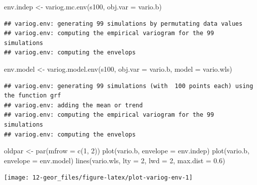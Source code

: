 \documentclass[
  spanish,
]{book}
\newenvironment{Shaded}{\begin{snugshade}}{\end{snugshade}}
\newcommand{\AttributeTok}[1]{\textcolor[rgb]{0.77,0.63,0.00}{#1}}
\newcommand{\DecValTok}[1]{\textcolor[rgb]{0.00,0.00,0.81}{#1}}
\newcommand{\FloatTok}[1]{\textcolor[rgb]{0.00,0.00,0.81}{#1}}
\newcommand{\FunctionTok}[1]{\textcolor[rgb]{0.00,0.00,0.00}{#1}}
\newcommand{\NormalTok}[1]{#1}
\newcommand{\OtherTok}[1]{\textcolor[rgb]{0.56,0.35,0.01}{#1}}
\theoremstyle{break}
\theoremstyle{definition}
\theoremstyle{definition}
\theoremstyle{definition}
\theoremstyle{definition}
\theoremstyle{remark}
\begin{document}
\begin{Shaded}
\begin{Highlighting}[]
\NormalTok{env.indep }\OtherTok{\textless{}{-}} \FunctionTok{variog.mc.env}\NormalTok{(s100, }\AttributeTok{obj.var =}\NormalTok{ vario.b)}
\end{Highlighting}
\end{Shaded}

\begin{verbatim}
## variog.env: generating 99 simulations by permutating data values
## variog.env: computing the empirical variogram for the 99 simulations
## variog.env: computing the envelops
\end{verbatim}

\begin{Shaded}
\begin{Highlighting}[]
\NormalTok{env.model }\OtherTok{\textless{}{-}} \FunctionTok{variog.model.env}\NormalTok{(s100, }\AttributeTok{obj.var =}\NormalTok{ vario.b, }\AttributeTok{model =}\NormalTok{ vario.wls)}
\end{Highlighting}
\end{Shaded}

\begin{verbatim}
## variog.env: generating 99 simulations (with  100 points each) using the function grf
## variog.env: adding the mean or trend
## variog.env: computing the empirical variogram for the 99 simulations
## variog.env: computing the envelops
\end{verbatim}

\begin{Shaded}
\begin{Highlighting}[]
\NormalTok{oldpar }\OtherTok{\textless{}{-}} \FunctionTok{par}\NormalTok{(}\AttributeTok{mfrow =} \FunctionTok{c}\NormalTok{(}\DecValTok{1}\NormalTok{, }\DecValTok{2}\NormalTok{))}
\FunctionTok{plot}\NormalTok{(vario.b, }\AttributeTok{envelope =}\NormalTok{ env.indep)}
\FunctionTok{plot}\NormalTok{(vario.b, }\AttributeTok{envelope =}\NormalTok{ env.model)}
\FunctionTok{lines}\NormalTok{(vario.wls, }\AttributeTok{lty =} \DecValTok{2}\NormalTok{, }\AttributeTok{lwd =} \DecValTok{2}\NormalTok{, }\AttributeTok{max.dist =} \FloatTok{0.6}\NormalTok{)}
\end{Highlighting}
\end{Shaded}

\begin{center}\texttt{[image: 12-geor\_files/figure-latex/plot-variog-env-1]} \end{center}
\end{document}
